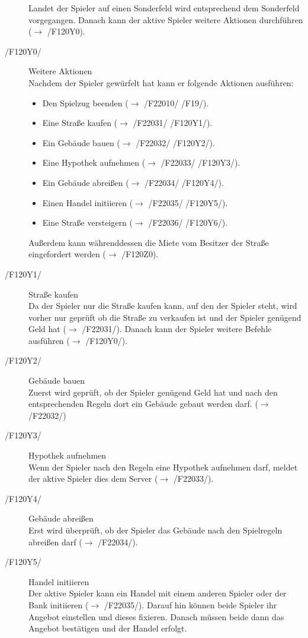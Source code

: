 \documentclass[a4paper,10pt]{article}
\begin{document}
\begin{description}
Landet der Spieler auf einen Sonderfeld wird entsprechend dem Sonderfeld vorgegangen. Danach kann der aktive Spieler weitere Aktionen durchführen ($\rightarrow$ /F120Y0).
\item[/F120Y0/] Weitere Aktionen \\
Nachdem der Spieler gewürfelt hat kann er folgende Aktionen ausführen:
\begin{itemize}
\item Den Spielzug beenden ($\rightarrow$ /F22010/ /F19/).
\item Eine Straße kaufen ($\rightarrow$ /F22031/ /F120Y1/).
\item Ein Gebäude bauen ($\rightarrow$ /F22032/ /F120Y2/).
\item Eine Hypothek aufnehmen ($\rightarrow$ /F22033/ /F120Y3/).
\item Ein Gebäude abreißen ($\rightarrow$ /F22034/ /F120Y4/).
\item Einen Handel initiieren ($\rightarrow$ /F22035/ /F120Y5/).
\item Eine Straße versteigern ($\rightarrow$ /F22036/ /F120Y6/).
\end{itemize}
Außerdem kann währenddessen die Miete vom Besitzer der Straße eingefordert werden ($\rightarrow$ /F120Z0).
\item[/F120Y1/] Straße kaufen \\
Da der Spieler nur die Straße kaufen kann, auf den der Spieler steht, wird vorher nur geprüft ob die Straße zu verkaufen ist und der Spieler genügend Geld hat ($\rightarrow$ /F22031/). Danach kann der Spieler weitere Befehle ausführen ($\rightarrow$ /F120Y0/).
\item[/F120Y2/] Gebäude bauen \\
Zuerst wird geprüft, ob der Spieler genügend Geld hat und nach den entsprechenden Regeln dort ein Gebäude gebaut werden darf. ($\rightarrow$ /F22032/)
\item[/F120Y3/] Hypothek aufnehmen \\
Wenn der Spieler nach den Regeln eine Hypothek aufnehmen darf, meldet der aktive Spieler dies dem Server ($\rightarrow$ /F22033/).
\item[/F120Y4/] Gebäude abreißen \\
Erst wird überprüft, ob der Spieler das Gebäude nach den Spielregeln abreißen darf ($\rightarrow$ /F22034/).
\item[/F120Y5/] Handel initiieren \\
Der aktive Spieler kann ein Handel mit einem anderen Spieler oder der Bank initiieren ($\rightarrow$ /F22035/). Darauf hin können beide Spieler ihr Angebot einstellen und dieses fixieren. Danach müssen beide dann das Angebot bestätigen und der Handel erfolgt.

\end{description}
\end{document}
